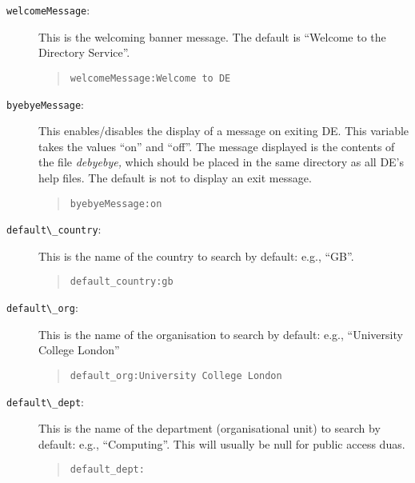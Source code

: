 \begin{description}

\item [\verb+welcomeMessage+:]  This is the welcoming banner message.  The 
default is ``Welcome to the Directory Service''.

\begin{quote}\small\begin{verbatim}
welcomeMessage:Welcome to DE
\end{verbatim}\end{quote}

\item [\verb+byebyeMessage+:]  This enables/disables the display of a 
message on
exiting DE.  This variable takes the values ``on'' and ``off''.  The 
message displayed is the contents of the file 
{\em debyebye,} which should be placed in the same directory as all
DE's help files.  The default is not to display an exit message.
 
\begin{quote}\small\begin{verbatim}
byebyeMessage:on
\end{verbatim}\end{quote}
  
\item [\verb+default\_country+:]  This is the name of the country to search by
default: e.g., ``GB''.

\begin{quote}\small\begin{verbatim}
default_country:gb
\end{verbatim}\end{quote}


\item [\verb+default\_org+:]  This is the name of the organisation to search by
default: e.g., ``University College London''

\begin{quote}\small\begin{verbatim}
default_org:University College London
\end{verbatim}\end{quote}

\item [\verb+default\_dept+:] This is the name of the department 
(organisational unit) to search by default: e.g., ``Computing''.  This will 
usually be null for public access duas.

\begin{quote}\small\begin{verbatim}
default_dept:
\end{verbatim}\end{quote}

\end{description}

